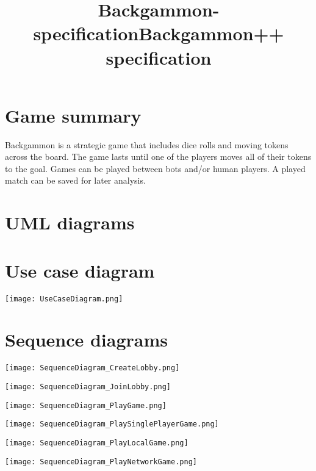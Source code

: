 \documentclass{article}
\title{Backgammon-specification}
\title{Backgammon++ specification}
\begin{document}
\maketitle

\section{Game summary}

Backgammon is a strategic game that includes dice rolls and moving tokens across the board.
The game lasts until one of the players moves all of their tokens to the goal. Games can be
played between bots and/or human players. A played match can be saved for later analysis.

\section{UML diagrams}

\section{Use case diagram}

\texttt{[image: UseCaseDiagram.png]}
\clearpage

\section{Sequence diagrams}

\texttt{[image: SequenceDiagram\_CreateLobby.png]}
\clearpage

\texttt{[image: SequenceDiagram\_JoinLobby.png]}
\clearpage

\texttt{[image: SequenceDiagram\_PlayGame.png]}
\clearpage

\texttt{[image: SequenceDiagram\_PlaySinglePlayerGame.png]}
\clearpage

\texttt{[image: SequenceDiagram\_PlayLocalGame.png]}
\clearpage

\texttt{[image: SequenceDiagram\_PlayNetworkGame.png]}
\clearpage
\end{document}
